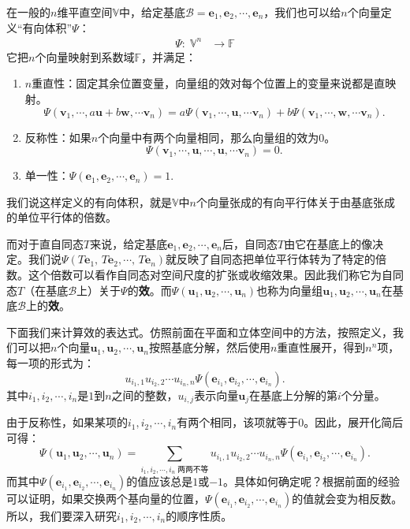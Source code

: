 \documentclass[12pt,UTF8,fontset=none]{ctexbook}
\begin{document}
在一般的$n$维平直空间$\mathbb{V}$中，给定基底$\mathcal{B} = \mathbf{e}_1,\mathbf{e}_2,\cdots,\mathbf{e}_n$，我们也可以给$n$个向量定义“有向体积”$\varPsi$：
\begin{align*}
    \varPsi : \;\mathbb{V}^n &\rightarrow \mathbb{F}  
\end{align*}
它把$n$个向量映射到系数域$\mathbb{F}$，并满足：
\begin{enumerate}
    \item $n$重直性：固定其余位置变量，向量组的效对每个位置上的变量来说都是直映射。
    $$\varPsi(\mathbf{v}_1, \cdots, a\mathbf{u} + b\mathbf{w}, \cdots \mathbf{v}_n) = a\varPsi(\mathbf{v}_1, \cdots, \mathbf{u}, \cdots \mathbf{v}_n) + b\varPsi(\mathbf{v}_1, \cdots, \mathbf{w}, \cdots \mathbf{v}_n).$$
    \item 反称性：如果$n$个向量中有两个向量相同，那么向量组的效为$0$。
    $$ \varPsi(\mathbf{v}_1, \cdots, \mathbf{u}, \cdots, \mathbf{u}, \cdots \mathbf{v}_n) = 0. $$
    \item 单一性：$\varPsi(\mathbf{e}_1, \mathbf{e}_2,\cdots,\mathbf{e}_n) = 1.$
\end{enumerate}
我们说这样定义的有向体积，就是$\mathbb{V}$中$n$个向量张成的有向平行体关于由基底张成的单位平行体的倍数。

而对于直自同态$T$来说，给定基底$\mathbf{e}_1,\mathbf{e}_2, \cdots, \mathbf{e}_n$后，自同态$T$由它在基底上的像决定。我们说$\varPsi(T\mathbf{e}_1, \,T\mathbf{e}_2,\cdots,\,T\mathbf{e}_n)$就反映了自同态把单位平行体转为了特定的倍数。这个倍数可以看作自同态对空间尺度的扩张或收缩效果。因此我们称它为自同态$T$（在基底$\mathcal{B}$上）关于$\varPsi$的\textbf{效}。而$\varPsi(\mathbf{u}_1, \mathbf{u}_2,\cdots,\mathbf{u}_n)$也称为向量组$\mathbf{u}_1, \mathbf{u}_2,\cdots,\mathbf{u}_n$在基底$\mathcal{B}$上的\textbf{效}。

下面我们来计算效的表达式。仿照前面在平面和立体空间中的方法，按照定义，我们可以把$n$个向量$\mathbf{u}_1, \mathbf{u}_2,\cdots,\mathbf{u}_n$按照基底分解，然后使用$n$重直性展开，得到$n^n$项，每一项的形式为：
$$ u_{i_1,1}u_{i_2,2}\cdots u_{i_n,n}\varPsi(\mathbf{e}_{i_1}, \mathbf{e}_{i_2},\cdots,\mathbf{e}_{i_n}).$$
其中$i_1,i_2,\cdots,i_n$是$1$到$n$之间的整数，$u_{i,j}$表示向量$\mathbf{u}_j$在基底上分解的第$i$个分量。

由于反称性，如果某项的$i_1,i_2,\cdots,i_n$有两个相同，该项就等于$0$。因此，展开化简后可得：
$$
\varPsi(\mathbf{u}_1, \mathbf{u}_2,\cdots,\mathbf{u}_n) = \sum_{i_1,i_2,\cdots,i_n\;\mbox{两两不等}} u_{i_1,1}u_{i_2,2}\cdots u_{i_n,n}\varPsi(\mathbf{e}_{i_1}, \mathbf{e}_{i_2},\cdots,\mathbf{e}_{i_n}).
$$
而其中$\varPsi(\mathbf{e}_{i_1}, \mathbf{e}_{i_2},\cdots,\mathbf{e}_{i_n})$的值应该总是$1$或$-1$。具体如何确定呢？根据前面的经验可以证明，如果交换两个基向量的位置，$\varPsi(\mathbf{e}_{i_1}, \mathbf{e}_{i_2},\cdots,\mathbf{e}_{i_n})$的值就会变为相反数。所以，我们要深入研究$i_1,i_2,\cdots,i_n$的顺序性质。
\end{document}
